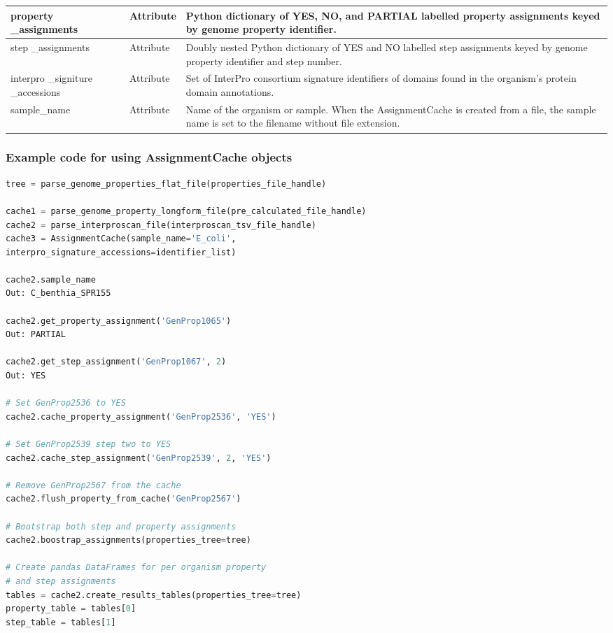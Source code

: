 \begin{longtable}{|p{2.7cm}|p{2cm}|p{10cm}|}
property \_assignments & Attribute & Python dictionary of YES, NO, and PARTIAL 
labelled property assignments keyed by genome property identifier. \\ \hline
step \_assignments & Attribute & Doubly nested Python dictionary of YES and NO 
labelled step assignments keyed by genome property identifier and step number. 
\\ \hline
interpro \_signiture \_accessions & Attribute & Set of InterPro consortium 
signature identifiers of domains found in the organism's protein domain 
annotations. \\ \hline
sample\_name & Attribute & Name of the organism or sample. When the 
AssignmentCache is created from a file, the sample name is set to the filename 
without file extension. \\ \hline
\end{longtable}

\subsubsection{Example code for using AssignmentCache  objects}

\begin{lstlisting}[language=Python]
tree = parse_genome_properties_flat_file(properties_file_handle)

cache1 = parse_genome_property_longform_file(pre_calculated_file_handle)
cache2 = parse_interproscan_file(interproscan_tsv_file_handle)
cache3 = AssignmentCache(sample_name='E_coli', 
interpro_signature_accessions=identifier_list)

cache2.sample_name
Out: C_benthia_SPR155

cache2.get_property_assignment('GenProp1065')
Out: PARTIAL

cache2.get_step_assignment('GenProp1067', 2) 
Out: YES

# Set GenProp2536 to YES
cache2.cache_property_assignment('GenProp2536', 'YES')

# Set GenProp2539 step two to YES
cache2.cache_step_assignment('GenProp2539', 2, 'YES')

# Remove GenProp2567 from the cache
cache2.flush_property_from_cache('GenProp2567')

# Bootstrap both step and property assignments
cache2.boostrap_assignments(properties_tree=tree)

# Create pandas DataFrames for per organism property
# and step assignments
tables = cache2.create_results_tables(properties_tree=tree)
property_table = tables[0]
step_table = tables[1]

\end{lstlisting}

